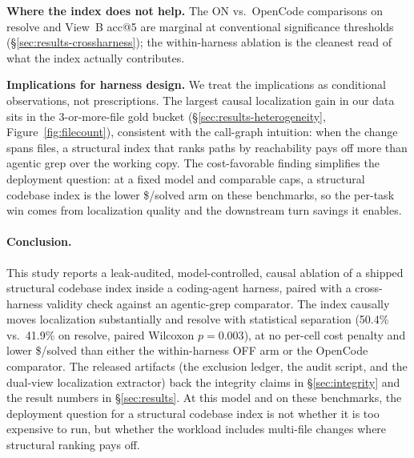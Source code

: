 \textbf{Where the index does not help.} The ON vs.\ OpenCode comparisons on resolve and
View~B acc@5 are marginal at conventional significance thresholds (\S\ref{sec:results-crossharness});
the within-harness ablation is the cleanest read of what the index actually contributes.

\textbf{Implications for harness design.} We treat the implications as conditional
observations, not prescriptions. The largest causal localization gain in our data sits in
the 3-or-more-file gold bucket (\S\ref{sec:results-heterogeneity},
Figure~\ref{fig:filecount}), consistent with the call-graph intuition: when the change
spans files, a structural index that ranks paths by reachability pays off more than
agentic grep over the working copy. The cost-favorable finding simplifies the deployment
question: at a fixed model and comparable caps, a structural codebase index is the lower
\$/solved arm on these benchmarks, so the per-task win comes from localization quality
and the downstream turn savings it enables.

\paragraph{Conclusion.} This study reports a leak-audited, model-controlled, causal
ablation of a shipped structural codebase index inside a coding-agent harness, paired
with a cross-harness validity check against an agentic-grep comparator. The index
causally moves localization substantially and resolve with statistical separation
(50.4\% vs.\ 41.9\% on resolve, paired Wilcoxon $p=0.003$), at no per-cell cost penalty
and lower \$/solved than either the within-harness OFF arm or the OpenCode comparator. The released artifacts (the
exclusion ledger, the audit script, and the dual-view localization extractor) back the
integrity claims in \S\ref{sec:integrity} and the result numbers in \S\ref{sec:results}.
At this model and on these benchmarks, the deployment question for a structural codebase
index is not whether it is too expensive to run, but whether the workload includes
multi-file changes where structural ranking pays off.
